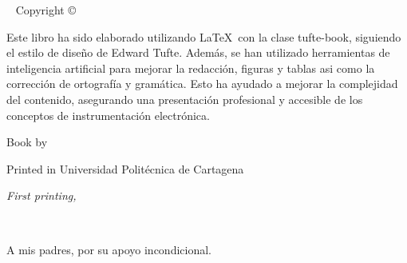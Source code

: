 \newpage
\begin{fullwidth}
~\vfill
\thispagestyle{empty}
\setlength{\parindent}{0pt}
\setlength{\parskip}{.5\baselineskip}
\textsf{Copyright \copyright\ \monthyear\ \thanklessauthor}
\par\textsf{Este libro ha sido elaborado utilizando \LaTeX\ con la clase \textsf{tufte-book}, siguiendo el estilo de diseño de Edward Tufte. Además, se han utilizado herramientas de inteligencia artificial para mejorar la redacción, figuras y tablas asi como la corrección de ortografía y gramática. Esto ha ayudado a mejorar la complejidad del contenido, asegurando una presentación profesional y accesible de los conceptos de instrumentación electrónica.}
\par\textsf{Book by \thanklessauthor}
\par\textsf{Printed in Universidad Politécnica de Cartagena}
\par\textit{First printing, \monthyear}
\end{fullwidth}

\cleardoublepage
~\vfill
\begin{doublespace}
\noindent%
\nohyphenation
A mis padres, por su apoyo incondicional.
\end{doublespace}
\vfill
\vfill

